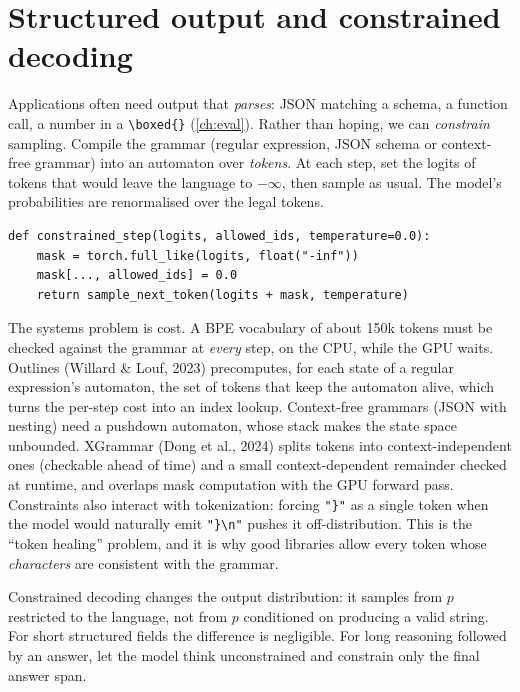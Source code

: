\section{Structured output and constrained decoding}\label{sec:efficient:structured}

Applications often need output that \emph{parses}: JSON matching a schema, a function
call, a number in a \texttt{\textbackslash boxed\{\}} (\cref{ch:eval}). Rather than hoping,
we can \emph{constrain} sampling. Compile the grammar (regular expression, JSON schema
or context-free grammar) into an automaton over \emph{tokens}. At each step, set the
logits of tokens that would leave the language to $-\infty$, then sample as usual. The
model's probabilities are renormalised over the legal tokens.

\begin{lstlisting}[caption={Masking logits to a legal token set. The hard part, computing
\ident{allowed_ids} efficiently from a grammar state, is what libraries such as Outlines
and XGrammar provide.},label={lst:efficient:constrain}]
def constrained_step(logits, allowed_ids, temperature=0.0):
    mask = torch.full_like(logits, float("-inf"))
    mask[..., allowed_ids] = 0.0
    return sample_next_token(logits + mask, temperature)
\end{lstlisting}

The systems problem is cost. A BPE vocabulary of about 150k tokens must be checked
against the grammar at \emph{every} step, on the CPU, while the GPU waits. Outlines
(Willard \& Louf, 2023) precomputes, for each state of a regular expression's automaton,
the set of tokens that keep the automaton alive, which turns the per-step cost into an
index lookup. Context-free grammars (JSON with nesting) need a pushdown automaton, whose
stack makes the state space unbounded. XGrammar (Dong et al., 2024) splits tokens into
context-independent ones (checkable ahead of time) and a small context-dependent
remainder checked at runtime, and overlaps mask computation with the GPU forward pass.
Constraints also interact with tokenization: forcing \texttt{"\}"} as a single token
when the model would naturally emit \texttt{"\}\textbackslash n"} pushes it
off-distribution. This is the ``token healing'' problem, and it is why good libraries
allow every token whose \emph{characters} are consistent with the grammar.

\begin{keyidea}
Constrained decoding changes the output distribution: it samples from $p$ restricted to
the language, not from $p$ conditioned on producing a valid string. For short structured
fields the difference is negligible. For long reasoning followed by an answer, let the
model think unconstrained and constrain only the final answer span.
\end{keyidea}

